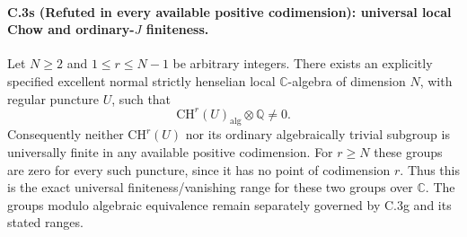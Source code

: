 \paragraph{C.3s (Refuted in every available positive codimension): universal local Chow and ordinary-$J$ finiteness.}
Let $N\ge2$ and $1\le r\le N-1$ be arbitrary integers.
There exists an explicitly specified excellent normal strictly
henselian local $\mathbb C$-algebra of dimension $N$, with regular
puncture $U$, such that
\[
       \mathrm{CH}^r(U)_{\mathrm{alg}}\otimes\mathbb Q\ne0.
\]
Consequently neither $\mathrm{CH}^r(U)$ nor its ordinary
algebraically trivial subgroup is universally finite in any
available positive codimension. For $r\ge N$ these groups
are zero for every such puncture, since it has no point of
codimension $r$. Thus this is the exact universal
finiteness/vanishing range for these two groups over $\mathbb C$.
The groups modulo algebraic equivalence remain separately
governed by C.3g and its stated ranges.

